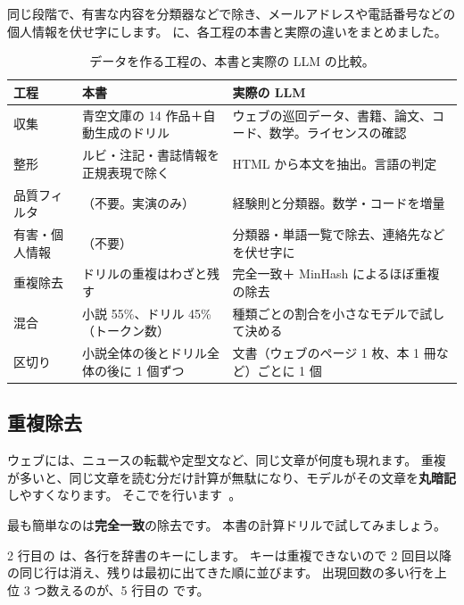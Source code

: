 同じ段階で、有害な内容を分類器などで除き、メールアドレスや電話番号などの個人情報を伏せ字にします。
に、各工程の本書と実際の違いをまとめました。

\begin{table}[tbp]
\centering
\caption{データを作る工程の、本書と実際の LLM の比較。}
\label{tab:pt-data-steps}
\footnotesize
\begin{tabular}{p{17mm}p{43mm}p{57mm}}
\toprule
工程 & 本書 & 実際の LLM \\
\midrule
収集 & 青空文庫の 14 作品＋自動生成のドリル & ウェブの巡回データ、書籍、論文、コード、数学。ライセンスの確認 \\
整形 & ルビ・注記・書誌情報を正規表現で除く & HTML から本文を抽出。言語の判定 \\
品質フィルタ & （不要。実演のみ） & 経験則と分類器。数学・コードを増量 \\
有害・個人情報 & （不要） & 分類器・単語一覧で除去、連絡先などを伏せ字に \\
重複除去 & ドリルの重複はわざと残す & 完全一致＋ MinHash によるほぼ重複の除去 \\
混合 & 小説 55\%、ドリル 45\%（トークン数） & 種類ごとの割合を小さなモデルで試して決める \\
区切り & 小説全体の後とドリル全体の後に 1 個ずつ & 文書（ウェブのページ 1 枚、本 1 冊など）ごとに 1 個 \\
\bottomrule
\end{tabular}
\end{table}

\subsection{重複除去}

ウェブには、ニュースの転載や定型文など、同じ文章が何度も現れます。
重複が多いと、同じ文章を読む分だけ計算が無駄になり、モデルがその文章を\textbf{丸暗記}しやすくなります。
そこでを行います~\cite{lee2022deduplicating,penedo2024fineweb}。

最も簡単なのは\textbf{完全一致}の除去です。
本書の計算ドリルで試してみましょう。


2 行目の  は、各行を辞書のキーにします。
キーは重複できないので 2 回目以降の同じ行は消え、残りは最初に出てきた順に並びます。
出現回数の多い行を上位 3 つ数えるのが、5 行目の  です。

